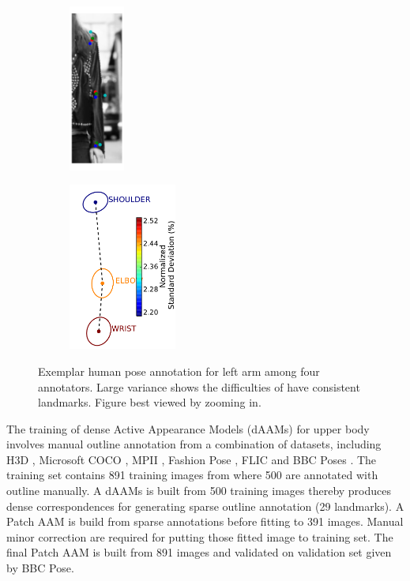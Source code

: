 \begin{figure}[t!]
\begin{subfigure}[b]{0.08\textwidth}
    \end{subfigure}
  	\hfill
    \begin{subfigure}[b]{0.08\textwidth}
            \includegraphics[height=5.5cm]{resources/Fig_Variance/image_6}
    \end{subfigure}
    \hfill
    \begin{subfigure}[b]{0.125\textwidth}
            \includegraphics[height=5.5cm]{resources/Fig_Variance/variances}
    \end{subfigure}
    \caption{Exemplar human pose annotation for left arm among four annotators. Large variance shows the difficulties of have consistent landmarks. Figure best viewed by zooming in.}
    \label{fig:variance}
\end{figure}

The training of dense Active Appearance Models (dAAMs) for upper body involves manual outline annotation from a combination of datasets, including H3D \cite{PoseletsICCV09}, Microsoft COCO \cite{lin2014microsoft}, MPII \cite{andriluka14cvpr}, Fashion Pose \cite{dantone2013human}, FLIC \cite{sapp2013modec} and BBC Poses \cite{pfister2015flowing}. The training set contains 891 training images from where 500 are annotated with outline manually. A dAAMs is built from 500 training images thereby produces dense correspondences for generating sparse outline annotation (29 landmarks). A Patch AAM is build from sparse annotations before fitting to 391 images. Manual minor correction are required for putting those fitted image to training set. The final Patch AAM is built from 891 images and validated on validation set given by BBC Pose.

